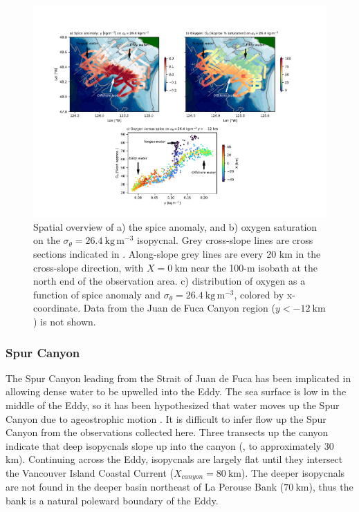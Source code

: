 \documentclass[draft]{agujournal2019}
\newcommand*{\Eddy}{{\sc Eddy}}
\begin{document}
\begin{figure}[htbp]
  \begin{center}
    \includegraphics[width=6.2in]{SpiceO2264}
    \caption{Spatial overview of a) the spice anomaly, and b) oxygen saturation on the $\sigma_{\theta} = 26.4\ \mathrm{kg\,m^{-3}}$ isopycnal.  Grey cross-slope lines are cross sections indicated in .  Along-slope grey lines are every 20 km in the cross-slope direction, with $X=0\ \mathrm{km}$ near the 100-m isobath at the north end of the observation area. c) distribution of oxygen as a function of spice anomaly and $\sigma_{\theta} = 26.4\ \mathrm{kg\,m^{-3}}$, colored by x-coordinate. Data from the Juan de Fuca Canyon region ($y<-12\ \mathrm{km}$) is not shown.
   \label{fig:SpiceO2264}
    }
  \end{center}
\end{figure}

\subsubsection{Spur Canyon}

The Spur Canyon leading from the Strait of Juan de Fuca has been implicated in allowing dense water to be upwelled into the \Eddy \cite{mackasetal87,weaverhsieh87}.  The sea surface is low in the middle of the \Eddy, so it has been hypothesized that water moves up the Spur Canyon due to ageostrophic motion \cite{weaverhsieh87,freelanddenman82}.  It is difficult to infer flow up the Spur Canyon from the observations collected here.  Three transects up the canyon indicate that deep isopycnals slope up into the canyon (, to approximately 30 km).  Continuing across the \Eddy, isopycnals are largely flat until they intersect the Vancouver Island Coastal Current ($X_{canyon} = 80\ \mathrm{km}$).  The deeper isopycnals are not found in the deeper basin northeast of La Perouse Bank ($70\ \mathrm{km}$),  thus the bank is a natural poleward boundary of the \Eddy.
\end{document}
